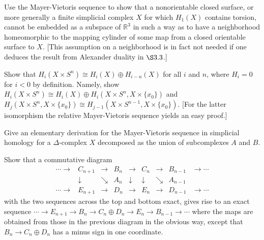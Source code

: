 \begin{exercise}
\end{exercise}

\begin{exercise}
Use the Mayer-Vietoris sequence to show that a nonorientable closed surface, or more generally a finite simplicial complex $X$ for which $H_1(X)$ contains torsion, cannot be embedded as a subspace of $\mathbb{R}^3$ in such a way as to have a neighborhood homeomorphic to the mapping cylinder of some map from a closed orientable surface to $X$. [This assumption on a neighborhood is in fact not needed if one deduces the result from Alexander duality in $\S 3.3$.]
\end{exercise}

\begin{exercise}
Show that $H_i(X \times S^n) \cong H_i(X) \oplus H_{i-n}(X)$ for all $i$ and $n$, where $H_i = 0$ for $i < 0$ by definition. Namely, show $H_i(X \times S^n) \cong H_i(X) \oplus H_i(X \times S^n, X \times \{x_0\})$ and $H_j(X \times S^n, X \times \{x_0\}) \cong H_{j-1}(X \times S^{n-1}, X \times \{x_0\})$. [For the latter isomorphism the relative Mayer-Vietoris sequence yields an easy proof.]
\end{exercise}

\begin{exercise}
Give an elementary derivation for the Mayer-Vietoris sequence in simplicial homology for a $\Delta$-complex $X$ decomposed as the union of subcomplexes $A$ and $B$.
\end{exercise}

\begin{exercise}
Show that a commutative diagram
\[
\begin{array}{ccccccccc}
\cdots \to & C_{n+1} & \to & B_n & \to & C_n & \to & B_{n-1} & \to \cdots \\
& \downarrow & \searrow & A_n & \downarrow & \downarrow & \searrow & A_{n-1} & \\
\cdots \to & E_{n+1} & \to & D_n & \to & E_n & \to & D_{n-1} & \to \cdots
\end{array}
\]
with the two sequences across the top and bottom exact, gives rise to an exact sequence $\cdots \to E_{n+1} \to B_n \to C_n \oplus D_n \to E_n \to B_{n-1} \to \cdots$ where the maps are obtained from those in the previous diagram in the obvious way, except that $B_n \to C_n \oplus D_n$ has a minus sign in one coordinate.
\end{exercise}

